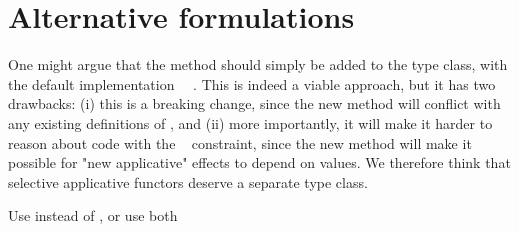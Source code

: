 \section{Alternative formulations}\label{sec-alternatives}

One might argue that the  method should simply be added to the
 type class, with the default implementation
~\hs{=}~. This is indeed a viable approach, but it has
two drawbacks: (i) this is a breaking change, since the new method will conflict
with any existing definitions of , and (ii) more importantly, it will
make it harder to reason about code with the ~ constraint,
since the new method will make it possible for "new applicative" effects to
depend on values. We therefore think that selective applicative functors deserve
a separate type class.

Use  instead of , or use both



